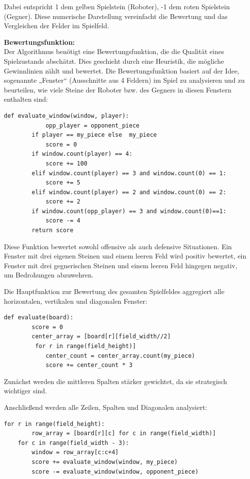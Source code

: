 Dabei entspricht 1 dem gelben Spielstein (Roboter), -1 dem roten Spielstein (Gegner). Diese numerische Darstellung vereinfacht die Bewertung und das Vergleichen der Felder im Spielfeld.

\textbf{Bewertungsfunktion:}\\
Der Algorithmus benötigt eine Bewertungsfunktion, die die Qualität eines Spielzustands abschätzt. Dies geschieht durch eine Heuristik, die mögliche Gewinnlinien zählt und bewertet.
Die Bewertungsfunktion basiert auf der Idee, sogenannte „Fenster“ (Ausschnitte aus 4 Feldern) im Spiel zu analysieren und zu beurteilen, wie viele Steine der Roboter bzw. des Gegners in diesen Fenstern enthalten sind:

\begin{lstlisting}[style=pythonstyle]
	def evaluate_window(window, player):
			opp_player = opponent_piece 
		if player == my_piece else 	my_piece
			score = 0
		if window.count(player) == 4:
			score += 100
		elif window.count(player) == 3 and window.count(0) == 1:
			score += 5
		elif window.count(player) == 2 and window.count(0) == 2:
			score += 2
		if window.count(opp_player) == 3 and window.count(0)==1:
			score -= 4
		return score
\end{lstlisting}

Diese Funktion bewertet sowohl offensive als auch defensive Situationen. Ein Fenster mit drei eigenen Steinen und einem leeren Feld wird positiv bewertet, ein Fenster mit drei gegnerischen Steinen und einem leeren Feld hingegen negativ, um Bedrohungen abzuwehren.

Die Hauptfunktion zur Bewertung des gesamten Spielfeldes aggregiert alle horizontalen, vertikalen und diagonalen Fenster:

\begin{lstlisting}[style=pythonstyle]
	def evaluate(board):
		score = 0
		center_array = [board[r][field_width//2]
		 for r in range(field_height)]
			center_count = center_array.count(my_piece)
			score += center_count * 3
\end{lstlisting}

Zunächst werden die mittleren Spalten stärker gewichtet, da sie strategisch wichtiger sind.

Anschließend werden alle Zeilen, Spalten und Diagonalen analysiert:

\begin{lstlisting}[style=pythonstyle]
	for r in range(field_height):
		row_array = [board[r][c] for c in range(field_width)]
	for c in range(field_width - 3):
		window = row_array[c:c+4]
		score += evaluate_window(window, my_piece)
		score -= evaluate_window(window, opponent_piece)
\end{lstlisting}

